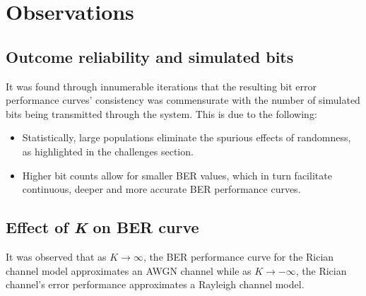\section{Observations}
\subsection{Outcome reliability and simulated bits}
It was found through innumerable iterations that the resulting bit error performance curves' consistency was commensurate with the number of simulated bits being transmitted through the system. This is due to the following:
\begin{itemize}
	\item Statistically, large populations eliminate the spurious effects of randomness, as highlighted in the challenges section.
		\item Higher bit counts allow for smaller BER values, which in turn facilitate continuous, deeper and more accurate BER performance curves.
\end{itemize}

\subsection{Effect of \emph{K} on BER curve}
It was observed that as \(K \to \infty\), the BER performance curve for the Rician channel model approximates an AWGN channel while as \(K \to -\infty\), the Rician channel's error performance approximates a Rayleigh channel model.

